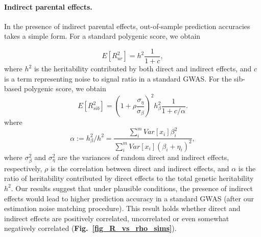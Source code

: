 \documentclass[hidelinks, 12pt]{article}
\begin{document}
\paragraph{Indirect parental effects.}  In the presence of indirect parental effects, out-of-sample prediction accuracies takes a simple form. For a standard polygenic score, we obtain

$$E[R_{ur}^2] = h^2\frac{1}{1+c},$$ where $h^2$ is the heritability contributed by both direct and indirect effects, and $c$ is a term representing noise to signal ratio in a standard GWAS.  For the sib-based polygenic score, we obtain
\begin{equation}
E[R_{sib}^2] = (1+\rho \frac{\sigma_\eta}{\sigma_\beta})^2 h_\beta^2 \frac{1}{1 + c/\alpha}.
\end{equation} where
$$\alpha := h_\beta^2 / h^2=  \frac{\sum_i^mVar[x_i]\beta_i^2}{\sum_i^mVar[x_i](\beta_i+\eta_i)^2},$$ where $\sigma_\beta^2$ and $\sigma_\eta^2$ are the variances of random direct and indirect effects, respectively, $\rho$ is the correlation between direct and indirect effects, and $\alpha$ is the ratio of heritability contributed by direct effects to the total genetic heritability $h^2$.  Our results suggest that under plausible conditions, the presence of indirect effects would lead to higher prediction accuracy in a standard GWAS (after our estimation noise matching procedure).  This result holds whether direct and indirect effects are positively correlated, uncorrelated or even somewhat negatively correlated ({\bf Fig.~\ref{fig_R_vs_rho_sims}}).
\end{document}
